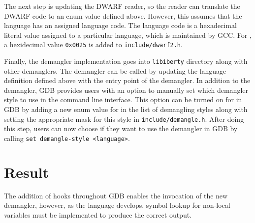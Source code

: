 The next step is updating the DWARF reader, so the reader can translate the DWARF code to an enum value defined
above. However, this assumes that the language has an assigned language code.
The language code is a hexadecimal literal value assigned to a particular
language, which is maintained by GCC. For \CFA, a hexidecimal value
\verb|0x0025| is added to \verb|include/dwarf2.h|.

Finally, the demangler implementation goes into \verb|libiberty| directory along with
other demanglers. The demangler can be called by updating the language
definition defined above with the entry point of the \CFAS demangler.
In addition to the demangler, GDB provides users with an option
to manually set which demangler style to use in the command line interface.
This option can be turned on for \CFAS in GDB by adding a new enum value for \CFAS in
the list of demangling styles along with setting the appropriate mask for this
style in \verb|include/demangle.h|. After doing this step, users can now choose
if they want to use the \CFAS demangler in GDB by calling \verb|set demangle-style <language>|.

\section{Result}
The addition of hooks throughout GDB enables the invocation of the new \CFAS demangler, however, as the
language develops, symbol lookup for non-local variables must be implemented to
produce the correct output.

